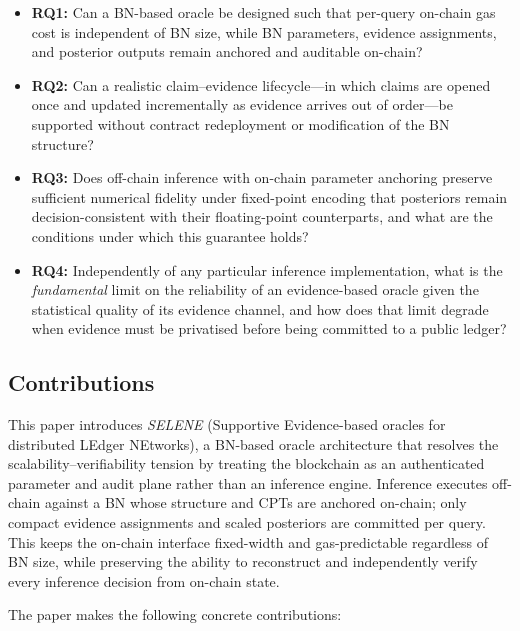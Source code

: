 \documentclass[journal]{IEEEtran}
\theoremstyle{definition}
\theoremstyle{remark}
\begin{document}
\begin{itemize}
  \item \textbf{RQ1:} Can a BN-based oracle be designed
  such that per-query on-chain gas cost is independent of
  BN size, while BN parameters, evidence assignments, and
  posterior outputs remain anchored and auditable on-chain?

  \item \textbf{RQ2:} Can a realistic claim--evidence
  lifecycle---in which claims are opened once and updated
  incrementally as evidence arrives out of order---be
  supported without contract redeployment or modification
  of the BN structure?

  \item \textbf{RQ3:} Does off-chain inference with
  on-chain parameter anchoring preserve sufficient
  numerical fidelity under fixed-point encoding that
  posteriors remain decision-consistent with their
  floating-point counterparts, and what are the conditions
  under which this guarantee holds?

  \item \textbf{RQ4:} Independently of any particular
  inference implementation, what is the \emph{fundamental}
  limit on the reliability of an evidence-based oracle
  given the statistical quality of its evidence channel,
  and how does that limit degrade when evidence must be
  privatised before being committed to a public ledger?
\end{itemize}

\subsection{Contributions}

This paper introduces \emph{SELENE} (Supportive Evidence-based oracles
for distributed LEdger NEtworks), a BN-based
oracle architecture that resolves the
scalability--verifiability tension by treating the
blockchain as an authenticated parameter and audit plane
rather than an inference engine.
Inference executes off-chain against a BN whose structure
and CPTs are anchored on-chain; only compact evidence
assignments and scaled posteriors are committed per query.
This keeps the on-chain interface fixed-width and
gas-predictable regardless of BN size, while preserving
the ability to reconstruct and independently verify every
inference decision from on-chain state.

The paper makes the following concrete contributions:
\end{document}
